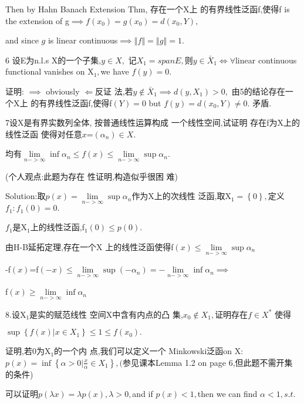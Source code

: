 \documentclass{article}
\begin{document}
\begin{CJK}{GBK}{song}
Then by Hahn Banach Extension Thm, 存在一个X上%
的有界线性泛函f,使得f
is the extension of g$\implies f\left( x_{0}\right) =g\left( x_{0}\right)
=d\left( x_{0},Y\right) ,$

and since $g$ is linear continuous$\implies \left\Vert f\right\Vert
=\left\Vert g\right\Vert =1.$

6 设E为n.l.s X的一个子集,$y\in X,$%
记$X_{1}=spanE,$则$y\in \bar{X}_{1}\iff \forall $linear
continuous functional vanishes on X$_{1},$we have $f\left( y\right) =0.$

证明: $\implies $ obviously $\Longleftarrow $反证%
法,若$y\notin \bar{X}_{1}\implies d\left( y,X_{1}\right) >0,$%
由5的结论存在一个X上%
的有界线性泛函f,使得f$%
\left( Y\right) =0$ but $f\left( y\right) =d\left( x_{0},Y\right) \neq 0.$%
矛盾.

7设X是有界实数列全体,%
按普通线性运算构成%
一个线性空间,试证明%
存在f为X上的线性泛函%
使得对任意$x$=$\left( \alpha _{n}\right) \in
X. $

均有$\underset{n->\infty }{\lim }\inf \alpha _{n}\leq f\left(
x\right) \leq \underset{n->\infty }{\lim }\sup \alpha _{n}.$

(个人观点:此题为存在%
性证明,构造似乎很困%
难)

Solution:\bigskip 取$p\left( x\right) =\underset{n->\infty }{\lim }%
\sup \alpha _{n}$作为X上的次线性%
泛函,取X$_{1}=\left\{ 0\right\} ,$定义$%
f_{1}:f_{1}\left( 0\right) =0.$

$f_{1}$是X$_{1}$上的线性泛函,f$%
_{1}\left( 0\right) \leq p\left( 0\right) .$

由H-B延拓定理,存在一个X%
上的线性泛函使得f$\left(
x\right) \leq \underset{n->\infty }{\lim }\sup \alpha _{n}$

-f$\left( x\right) $=f$\left( -x\right) \leq \underset{n->\infty }{\lim }%
\sup \left( -\alpha _{n}\right) =-\underset{n->\infty }{\lim }\inf \alpha
_{n}\implies $

f$\left( x\right) \geq \underset{n->\infty }{\lim }\inf \alpha _{n}$

8.设X$_{1}$是实的赋范线性%
空间X中含有内点的凸%
集,$x_{0}\notin X_{1},$证明存在$f\in X^{\ast }$%
使得

$\sup \left\{ f\left( x\right) |x\in X_{1}\right\} \leq 1\leq f\left(
x_{0}\right) .$

证明,若0为X$_{1}$的一个内%
点,我们可以定义一个%
Minkowski泛函on X: $p\left( x\right) =\inf \left\{ \alpha >0|%
\frac{x}{\alpha }\in X_{1}\right\} ,($参见课本Lemma
1.2 on page 6,但此题不需开集%
的条件)

\bigskip 可以证明$p\left( \lambda x\right) =\lambda
p\left( x\right) ,\lambda >0,$and if $p\left( x\right) <1,$then we can find $%
\alpha <1,s.t.$


\end{CJK}
\end{document}
